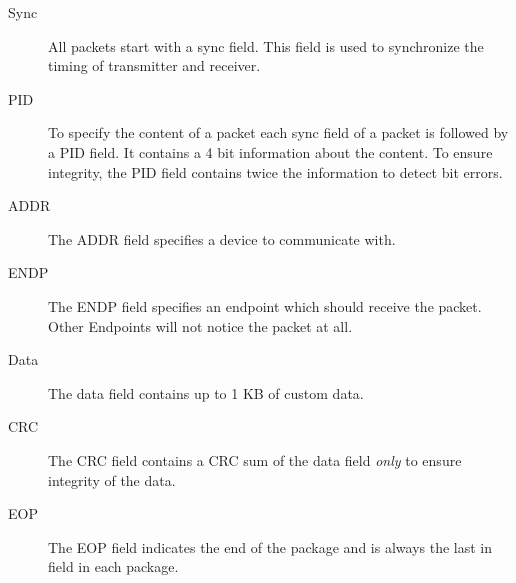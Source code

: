 \documentclass{acm_proc_article-sp}
\begin{document}
\begin{description}
\item[Sync]
All packets start with a sync field.
This field is used to synchronize the timing of transmitter and receiver. \cite{usb}

\item[PID]
To specify the content of a packet each sync field of a packet is followed by a PID field.
It contains a 4 bit information about the content.
To ensure integrity, the PID field contains twice the information to detect bit errors.

\item[ADDR]
The ADDR field specifies a device to communicate with. \cite{usb}

\item[ENDP]
The ENDP field specifies an endpoint which should receive the packet.
Other Endpoints will not notice the packet at all. \cite{usb}

\item[Data]
The data field contains up to 1 KB of custom data. \cite{usb}

\item [CRC]
The CRC field contains a CRC sum of the data field \emph{only} to ensure integrity of the data. \cite{usb}

\item[EOP]
The EOP field indicates the end of the package and is always the last in field in each package. \cite{usb}

\end{description}
\end{document}
